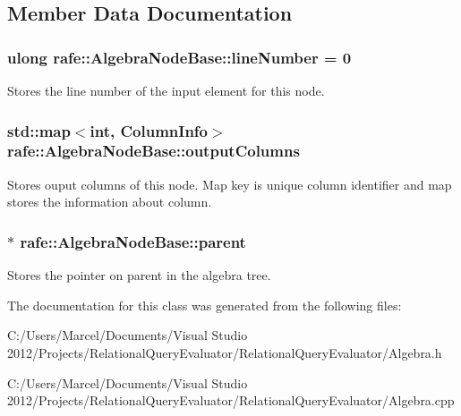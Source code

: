 \subsection{Member Data Documentation}
\hypertarget{classrafe_1_1_algebra_node_base_a9ad122f37de5260754daaf517d3d5ed0}{
\subsubsection[{line\+Number}]{\setlength{\rightskip}{0pt plus 5cm}ulong rafe\+::\+Algebra\+Node\+Base\+::line\+Number = 0}}\label{classrafe_1_1_algebra_node_base_a9ad122f37de5260754daaf517d3d5ed0}
Stores the line number of the input element for this node. \hypertarget{classrafe_1_1_algebra_node_base_aadae640fc5528efe6ce06c2171ba8075}{
\subsubsection[{output\+Columns}]{\setlength{\rightskip}{0pt plus 5cm}std\+::map$<$int, {\bf Column\+Info}$>$ rafe\+::\+Algebra\+Node\+Base\+::output\+Columns}}\label{classrafe_1_1_algebra_node_base_aadae640fc5528efe6ce06c2171ba8075}
Stores ouput columns of this node. Map key is unique column identifier and map stores the information about column. \hypertarget{classrafe_1_1_algebra_node_base_a7dbfa2771e290b5e72bfe5c5177b7888}{
\subsubsection[{parent}]{$\ast$ rafe\+::\+Algebra\+Node\+Base\+::parent}}\label{classrafe_1_1_algebra_node_base_a7dbfa2771e290b5e72bfe5c5177b7888}
Stores the pointer on parent in the algebra tree. 

The documentation for this class was generated from the following files\+:\begin{DoxyCompactItemize}
\item 
C\+:/\+Users/\+Marcel/\+Documents/\+Visual Studio 2012/\+Projects/\+Relational\+Query\+Evaluator/\+Relational\+Query\+Evaluator/Algebra.\+h\item 
C\+:/\+Users/\+Marcel/\+Documents/\+Visual Studio 2012/\+Projects/\+Relational\+Query\+Evaluator/\+Relational\+Query\+Evaluator/Algebra.\+cpp\end{DoxyCompactItemize}
